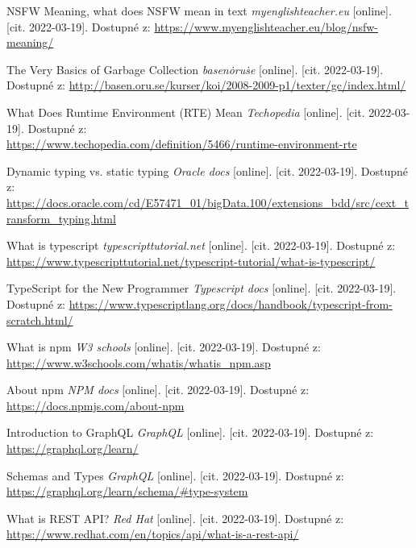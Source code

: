 \begin{thebibliography}{100}

 NSFW Meaning, what does NSFW mean in text \textit{myenglishteacher.eu} [online]. [cit. 2022-03-19]. Dostupné z: \url{https://www.myenglishteacher.eu/blog/nsfw-meaning/}

 The Very Basics of Garbage Collection \textit{basen\.oru\.se} [online]. [cit. 2022-03-19]. Dostupné z: \url{http://basen.oru.se/kurser/koi/2008-2009-p1/texter/gc/index.html/}

 What Does Runtime Environment (RTE) Mean \textit{Techopedia} [online]. [cit. 2022-03-19]. Dostupné z: \\ \url{https://www.techopedia.com/definition/5466/runtime-environment-rte}

 Dynamic typing vs. static typing \textit{Oracle docs} [online]. [cit. 2022-03-19]. Dostupné z: \\ \url{https://docs.oracle.com/cd/E57471_01/bigData.100/extensions_bdd/src/cext_transform_typing.html}

 What is typescript \textit{typescripttutorial.net} [online]. [cit. 2022-03-19]. Dostupné z: \url{https://www.typescripttutorial.net/typescript-tutorial/what-is-typescript/}

 TypeScript for the New Programmer \textit{Typescript docs} [online]. [cit. 2022-03-19]. Dostupné z: \url{https://www.typescriptlang.org/docs/handbook/typescript-from-scratch.html/}

 What is npm \textit{W3 schools} [online]. [cit. 2022-03-19]. Dostupné z: \url{https://www.w3schools.com/whatis/whatis_npm.asp}

 About npm \textit{NPM docs} [online]. [cit. 2022-03-19]. Dostupné z: \url{https://docs.npmjs.com/about-npm}

 Introduction to GraphQL \textit{GraphQL} [online]. [cit. 2022-03-19]. Dostupné z: \url{https://graphql.org/learn/}

 Schemas and Types \textit{GraphQL} [online]. [cit. 2022-03-19]. Dostupné z: \url{https://graphql.org/learn/schema/#type-system}

 What is REST API? \textit{Red Hat} [online]. [cit. 2022-03-19]. Dostupné z: \url{https://www.redhat.com/en/topics/api/what-is-a-rest-api/}


\end{thebibliography}
